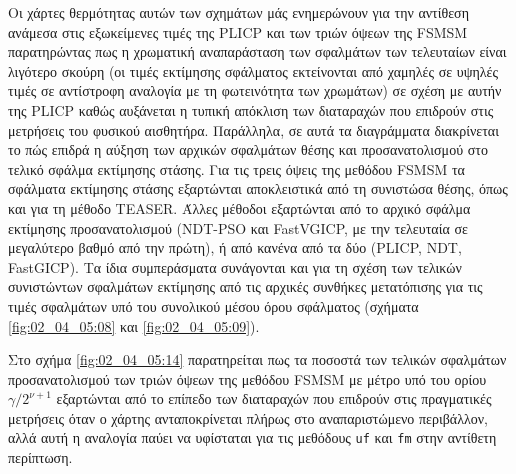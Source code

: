 Οι χάρτες θερμότητας αυτών των σχημάτων μάς ενημερώνουν για την αντίθεση
ανάμεσα στις εξωκείμενες τιμές της PLICP και των τριών όψεων της FSMSM
παρατηρώντας πως η χρωματική αναπαράσταση των σφαλμάτων των τελευταίων είναι
λιγότερο σκούρη (οι τιμές εκτίμησης σφάλματος εκτείνονται από χαμηλές σε υψηλές
τιμές σε αντίστροφη αναλογία με τη φωτεινότητα των χρωμάτων) σε σχέση με αυτήν
της PLICP καθώς αυξάνεται η τυπική απόκλιση των διαταραχών που επιδρούν στις
μετρήσεις του φυσικού αισθητήρα. Παράλληλα, σε αυτά τα διαγράμματα διακρίνεται
το πώς επιδρά η αύξηση των αρχικών σφαλμάτων θέσης και προσανατολισμού στο
τελικό σφάλμα εκτίμησης στάσης. Για τις τρεις όψεις της μεθόδου FSMSM τα
σφάλματα εκτίμησης στάσης εξαρτώνται αποκλειστικά από τη συνιστώσα θέσης, όπως
και για τη μέθοδο TEASER. Άλλες μέθοδοι εξαρτώνται από το αρχικό σφάλμα
εκτίμησης προσανατολισμού (NDT-PSO και FastVGICP, με την τελευταία σε
μεγαλύτερο βαθμό από την πρώτη), ή από κανένα από τα δύο (PLICP, NDT,
FastGICP). Τα ίδια συμπεράσματα συνάγονται και για τη σχέση των τελικών
συνιστώντων σφαλμάτων εκτίμησης από τις αρχικές συνθήκες μετατόπισης για τις
τιμές σφαλμάτων υπό του συνολικού μέσου όρου σφάλματος (σχήματα
\ref{fig:02_04_05:08} και \ref{fig:02_04_05:09}).

Στο σχήμα \ref{fig:02_04_05:14} παρατηρείται πως τα ποσοστά των τελικών
σφαλμάτων προσανατολισμού των τριών όψεων της μεθόδου FSMSM με μέτρο υπό του
ορίου $\gamma / 2^{\nu+1}$ εξαρτώνται από το επίπεδο των διαταραχών που
επιδρούν στις πραγματικές μετρήσεις όταν ο χάρτης ανταποκρίνεται πλήρως στο
αναπαριστώμενο περιβάλλον, αλλά αυτή η αναλογία παύει να υφίσταται για τις
μεθόδους \texttt{uf} και \texttt{fm} στην αντίθετη περίπτωση.
